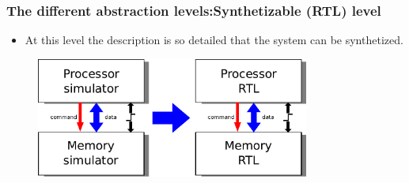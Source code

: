{\begin{frame}
	\frametitle{The different abstraction levels:\newline Synthetizable (RTL) level}
	\begin{itemize}
		\item<1-> At this level the description is so detailed that the system can be synthetized.
	\end{itemize}
	\begin{figure}[h]
		\includegraphics[width=0.8\textwidth]{introduction/figures/fibonacci_cycle_to_rtl_level.pdf}
	\end{figure}
\end{frame}
}

